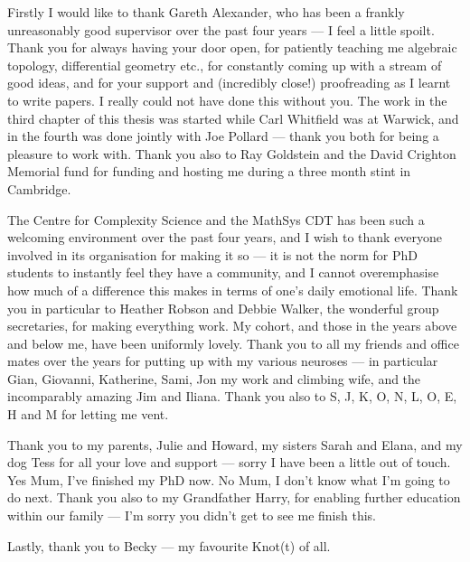 Firstly I would like to thank Gareth Alexander, who has been a frankly unreasonably good supervisor over the past four years --- I feel a little spoilt. Thank you for always having your door open, for patiently teaching me algebraic topology, differential geometry etc., for constantly coming up with a stream of good ideas, and for your support and (incredibly close!) proofreading as I learnt to write papers. I really could not have done this without you. The work in the third chapter of this thesis was started while Carl Whitfield was at Warwick, and in the fourth was done jointly with Joe Pollard --- thank you both for being a pleasure to work with. Thank you also to Ray Goldstein and the David Crighton Memorial fund for funding and hosting me during a three month stint in Cambridge.  

The Centre for Complexity Science and the MathSys CDT has been such a welcoming environment over the past four years, and I wish to thank everyone involved in its organisation for making it so --- it is not the norm for PhD students to instantly feel they have a community, and I cannot overemphasise how much of a difference this makes in terms of one's daily emotional life. Thank you in particular to Heather Robson and Debbie Walker, the wonderful group secretaries, for making everything work.  My cohort, and those in the years above and below me, have been uniformly lovely. Thank you to all my friends and office mates over the years for putting up with my various neuroses --- in particular Gian, Giovanni, Katherine, Sami, Jon my work and climbing wife, and the incomparably amazing Jim and Iliana. Thank you also to S, J, K, O, N, L, O, E, H and M for letting me vent.

Thank you to my parents, Julie and Howard, my sisters Sarah and Elana, and my dog Tess for all your love and support --- sorry I have been a little out of touch. Yes Mum, I've finished my PhD now. No Mum, I don't know what I'm going to do next. Thank you also to my Grandfather Harry, for enabling further education within our family --- I'm sorry you didn't get to see me finish this.

 Lastly, thank you to Becky --- my favourite Knot(t) of all.

